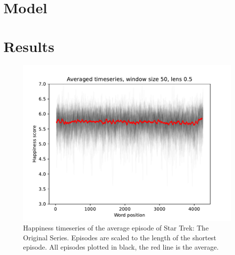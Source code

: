 \section{Model}
\label{sec:papertag.model}

\section{Results}
\label{sec:papertag.results}


\begin{figure}
    \centering
    \includegraphics[width=\columnwidth]{figures/localized/average_episode_tos.pdf}
    \caption{Happiness timeseries of the average episode of Star Trek: The Original Series. Episodes are scaled to the length of the shortest episode. All episodes plotted in black, the red line is the average.}
    \label{fig:average_episode_tos}
\end{figure}

